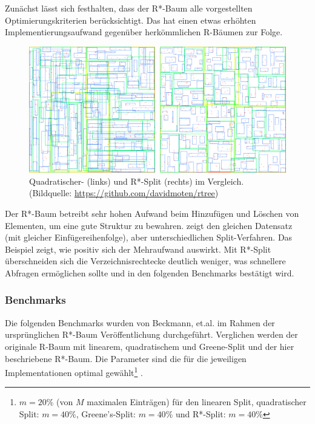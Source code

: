 \documentclass[runningheads,a4paper]{llncs}
\begin{document}
	Zunächst lässt sich festhalten, dass der R*-Baum alle vorgestellten Optimierungskriterien berücksichtigt. Das hat einen etwas erhöhten Implementierungsaufwand gegenüber herkömmlichen R-Bäumen zur Folge.

	\begin{figure}[H]
		\centering
		\includegraphics[width=1\textwidth]{vergleich-quad-star.png}
		\caption{Quadratischer- (links) und R*-Split (rechts) im Vergleich. (Bildquelle: \url{https://github.com/davidmoten/rtree})}
		\label{fig:vergleich-quad-star}
	\end{figure}

	Der R*-Baum betreibt sehr hohen Aufwand beim Hinzufügen und Löschen von Elementen, um eine gute Struktur zu bewahren.  zeigt den gleichen Datensatz (mit gleicher Einfügereihenfolge), aber unterschiedlichen Split-Verfahren. Das Beispiel zeigt, wie positiv sich der Mehraufwand auswirkt. Mit R*-Split überschneiden sich die Verzeichnisrechtecke deutlich weniger, was schnellere Abfragen ermöglichen sollte und in den folgenden Benchmarks bestätigt wird.

	\subsubsection{Benchmarks} %
	\label{ssub:benchmarks}

	Die folgenden Benchmarks wurden von Beckmann, et.al. im Rahmen der ursprünglichen R*-Baum Veröffentlichung durchgeführt. Verglichen werden der originale R-Baum mit linearem, quadratischem und Greene-Split und der hier beschriebene R*-Baum. Die Parameter sind die für die jeweiligen Implementationen optimal gewählt\footnote{$m=20\%$ (von $M$ maximalen Einträgen) für den linearen Split, quadratischer Split: $m=40\%$, Greene's-Split: $m=40\%$ und R*-Split: $m=40\%$} \citep[vgl.][328]{Beckmann:1990}.
\end{document}
